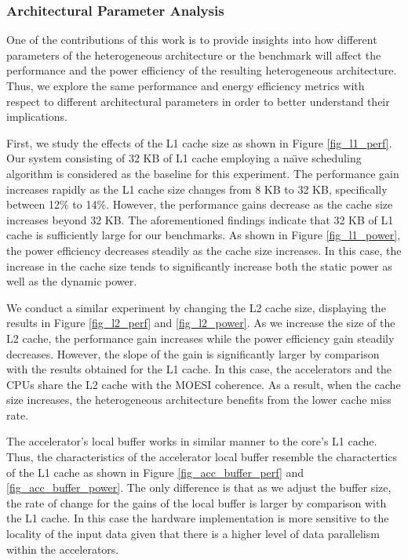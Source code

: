 \subsubsection{Architectural Parameter Analysis}

One of the contributions of this work is to provide insights into how
different parameters of the heterogeneous architecture or the
benchmark will affect the performance and the power efficiency of the
resulting heterogeneous architecture. Thus, we explore the same performance and
energy efficiency metrics with respect to different architectural parameters in order to
 better understand their implications. 

First, we study the effects of the L1 cache size as shown in Figure \ref{fig_l1_perf}. Our
system consisting of 32 KB of L1 cache employing a na\"{\i}ve scheduling algorithm is considered as the
baseline for this experiment. The performance gain increases rapidly as the
L1 cache size changes from 8 KB to 32 KB, specifically between 12\% to 14\%.
However, the performance gains decrease as the cache size increases beyond 32
KB. The aforementioned findings indicate that 32 KB of L1 cache is sufficiently large
 for our benchmarks. As shown in Figure
\ref{fig_l1_power}, the power efficiency decreases
steadily as the cache size increases. In this case, the increase in the cache size 
tends to significantly increase both the static power as well as the dynamic power. 

We conduct a similar experiment by changing the L2 cache size, displaying
the results in Figure \ref{fig_l2_perf} and \ref{fig_l2_power}. As
we increase the size of the L2 cache, the performance gain increases while the
power efficiency gain steadily decreases. However, the slope of the gain is significantly larger by comparison with the results obtained for 
the L1 cache. In this case, the accelerators and the CPUs share the L2 cache with the MOESI coherence. As a result, when the cache size 
increases, the heterogeneous architecture benefits from the lower cache miss rate. 

The accelerator's local buffer works in similar manner to the core's L1 cache. Thus, the characteristics of the accelerator local buffer 
resemble the charactertics of the L1 cache as shown in Figure \ref{fig_acc_buffer_perf} and \ref{fig_acc_buffer_power}. 
The only difference is that as we adjust the buffer size, the rate of change for the gains of the local buffer is larger 
by comparison with the L1 cache. In this case the hardware implementation is more sensitive to the locality of the input data
 given that there is a higher level of data parallelism within the accelerators. 

